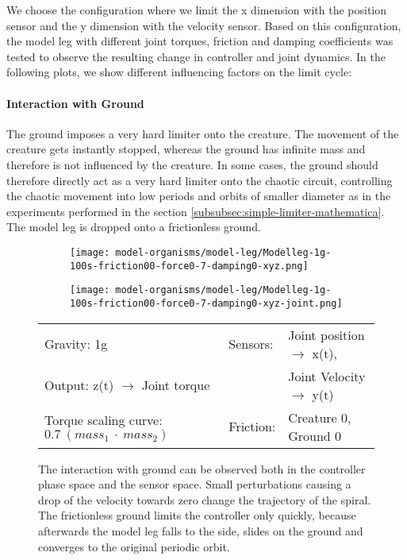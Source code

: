 \documentclass[main]{subfiles}
\begin{document}
We choose the configuration where we limit the x dimension with the position sensor and the y dimension with the velocity sensor. %
%
Based on this configuration, the model leg with different joint torques, friction and damping coefficients was tested to observe the resulting change in controller and joint dynamics. %
%
In the following plots, we show different influencing factors on the limit cycle:

\paragraph{Interaction with Ground} The ground imposes a very hard limiter onto the creature. %
%
The movement of the creature gets instantly stopped, whereas the ground has infinite mass and therefore is not influenced by the creature. %
%
In some cases, the ground should therefore directly act as a very hard limiter onto the chaotic circuit, controlling the chaotic movement into low periods and orbits of smaller diameter as in the experiments performed in the section \ref{subsubsec:simple-limiter-mathematica}. 
%
The model leg is dropped onto a frictionless ground. 
\begin{figure}[H]
	\centering
		\begin{subfigure}[c]{0.45\textwidth}
	\texttt{[image: model-organisms/model-leg/Modelleg-1g-100s-friction00-force0-7-damping0-xyz.png]}
		\end{subfigure}
	\begin{subfigure}[c]{0.45\textwidth}
	\texttt{[image: model-organisms/model-leg/Modelleg-1g-100s-friction00-force0-7-damping0-xyz-joint.png]}
		\end{subfigure}
	\caption[Limited chaotic controller controlling model leg on frictionless ground.]{The interaction with ground can be observed both in the controller phase space and the sensor space. Small perturbations causing a drop of the velocity towards zero change the trajectory of the spiral. The frictionless ground limits the controller only quickly, because afterwards the model leg falls to the side, slides on the ground and converges to the original periodic orbit.}
	\begin{tabular}{l|ll}
	\hline 
	Gravity: 1g  & Sensors: & Joint position \(\rightarrow\) x(t),\\
	 Output: z(t) \(\rightarrow\) Joint torque &  & Joint Velocity \(\rightarrow\) y(t) \\
	  Torque scaling curve: \(0.7~(mass_1~\cdot~mass_2)\) & Friction: & Creature 0, Ground 0 \\
	  \hline
	\end{tabular}
	
	\label{figure:limited-damped-model-leg-collision1}
\end{figure}
\end{document}
